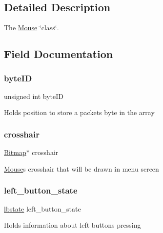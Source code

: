\subsection{Detailed Description}
The \hyperlink{struct_mouse}{Mouse} \char`\"{}class\char`\"{}. 

\subsection{Field Documentation}
\hypertarget{struct_mouse_a593aab8c835cac0b2110f8d4e3f4124e}{}\label{struct_mouse_a593aab8c835cac0b2110f8d4e3f4124e} 
\subsubsection{\texorpdfstring{byte\+ID}{byteID}}
{\footnotesize\ttfamily unsigned int byte\+ID}

Holds position to store a packet\textquotesingle{}s byte in the array \hypertarget{struct_mouse_a6d9b94480453acd797d61e51453ff026}{}\label{struct_mouse_a6d9b94480453acd797d61e51453ff026} 
\subsubsection{\texorpdfstring{crosshair}{crosshair}}
{\footnotesize\ttfamily \hyperlink{struct_bitmap}{Bitmap}$\ast$ crosshair}

\hyperlink{struct_mouse}{Mouse}\textquotesingle{}s crosshair that will be drawn in menu screen \hypertarget{struct_mouse_a3460dc9908f5759debb0d94ccd939eb0}{}\label{struct_mouse_a3460dc9908f5759debb0d94ccd939eb0} 
\subsubsection{\texorpdfstring{left\+\_\+button\+\_\+state}{left\_button\_state}}
{\footnotesize\ttfamily \hyperlink{group__mouse_gaab5a16f4c5c371d5048e7a729a8b45c7}{lbstate} left\+\_\+button\+\_\+state}

Holds information about left button\textquotesingle{}s pressing \hypertarget{struct_mouse_a0fc78a583cf4573ff7df06591ac3b4ef}{}\label{struct_mouse_a0fc78a583cf4573ff7df06591ac3b4ef} 
